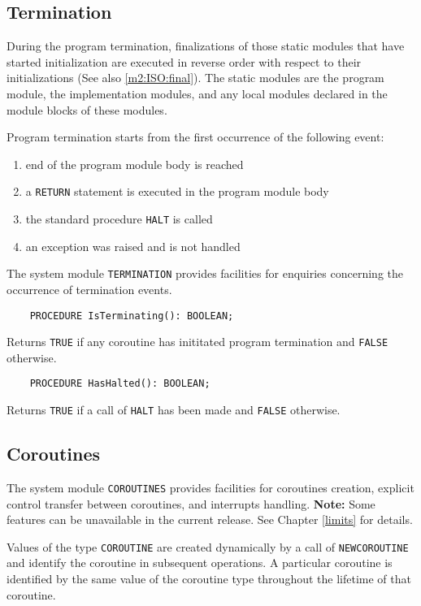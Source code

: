 \subsection{Termination}\label{m2:ISO:termination}

During the program termination, finalizations of those static
modules that have started initialization are executed in
reverse order with respect to their initializations (See also
\ref{m2:ISO:final}). The static modules are the program module,
the implementation modules, and any local modules declared in the
module blocks of these modules.

Program termination starts from the first occurrence of the
following event:
\begin{enumerate}
\item end of the program module body is reached
\item a \verb'RETURN' statement is executed in the program module body
\item the standard procedure \verb'HALT' is called
\item an exception was raised and is not handled
\end{enumerate}

The system module {\tt TERMINATION}
provides facilities for enquiries concerning
the occurrence of termination events.

\verb'    PROCEDURE IsTerminating(): BOOLEAN;'

Returns \verb'TRUE' if any coroutine has inititated
program termination and \verb'FALSE' otherwise.

\verb'    PROCEDURE HasHalted(): BOOLEAN;'

Returns \verb'TRUE' if a call of \verb'HALT'
has been made and \verb'FALSE' otherwise.

\subsection{Coroutines}\label{m2:ISO:coroutines}

The system module {\tt COROUTINES} provides facilities for
coroutines creation, explicit control transfer between
coroutines, and interrupts handling.
{\bf Note:} Some features can be unavailable in the current release.
See Chapter \ref{limits} for details.

Values of the type {\tt COROUTINE} are created dynamically by a
call of {\tt NEWCOROUTINE} and identify the coroutine in
subsequent operations. A particular coroutine is identified by
the same value of the coroutine type throughout the lifetime of
that coroutine.

